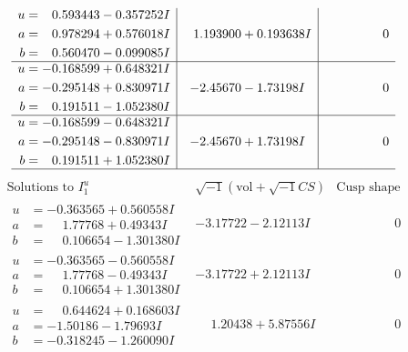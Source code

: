 \documentclass[1p]{elsarticle_modified}
\theoremstyle{definition}
\newcommand{\I}{\sqrt{-1}}
\begin{document}
$$\begin{array}{c|c|c}
\begin{aligned}
u &= \phantom{-}0.593443 - 0.357252 I \\
a &= \phantom{-}0.978294 + 0.576018 I \\
b &= \phantom{-}0.560470 - 0.099085 I\end{aligned}
 & \phantom{-}1.193900 + 0.193638 I & \phantom{-0.000000 } 0 \\ \hline\begin{aligned}
u &= -0.168599 + 0.648321 I \\
a &= -0.295148 + 0.830971 I \\
b &= \phantom{-}0.191511 - 1.052380 I\end{aligned}
 & -2.45670 - 1.73198 I & \phantom{-0.000000 } 0 \\ \hline\begin{aligned}
u &= -0.168599 - 0.648321 I \\
a &= -0.295148 - 0.830971 I \\
b &= \phantom{-}0.191511 + 1.052380 I\end{aligned}
 & -2.45670 + 1.73198 I & \phantom{-0.000000 } 0\\
 \hline 
 \end{array}$$\newpage$$\begin{array}{c|c|c}  
\text{Solutions to }I^u_{1}& \I (\text{vol} + \sqrt{-1}CS) & \text{Cusp shape}\\
 \hline 
\begin{aligned}
u &= -0.363565 + 0.560558 I \\
a &= \phantom{-}1.77768 + 0.49343 I \\
b &= \phantom{-}0.106654 - 1.301380 I\end{aligned}
 & -3.17722 - 2.12113 I & \phantom{-0.000000 } 0 \\ \hline\begin{aligned}
u &= -0.363565 - 0.560558 I \\
a &= \phantom{-}1.77768 - 0.49343 I \\
b &= \phantom{-}0.106654 + 1.301380 I\end{aligned}
 & -3.17722 + 2.12113 I & \phantom{-0.000000 } 0 \\ \hline\begin{aligned}
u &= \phantom{-}0.644624 + 0.168603 I \\
a &= -1.50186 - 1.79693 I \\
b &= -0.318245 - 1.260090 I\end{aligned}
 & \phantom{-}1.20438 + 5.87556 I & \phantom{-0.000000 } 0 \\ \hline\begin{aligned}

\end{aligned}
\end{array}$$
\end{document}
